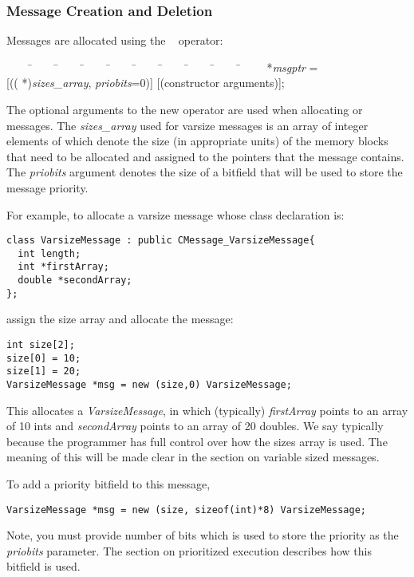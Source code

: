\subsubsection{Message Creation and Deletion}
\label{memory allocation}

Messages are allocated using the \CC\  operator:

\begin{tabbing}
~~~~ \=~~~~ \=~~~~ \=~~~~ \=~~~~ \=~~~~ \=~~~~ \=~~~~ \=~~~~ \=~~~~ \kill
\>  *{\it msgptr} = \\
\> \>  [(( *){\it sizes\_array},  {\it priobits}=0)] 
[(constructor arguments)]; \\
\end{tabbing}

The optional arguments to the new operator are used when allocating 
 or  messages. The {\it sizes\_array} 
used for varsize messages is an 
array of integer elements of which denote the size (in appropriate
units) of the memory blocks that need to be allocated and assigned to the
pointers that the message contains. The {\it priobits} argument 
denotes the size of a bitfield that will be used to store the message 
priority.   

For example, to allocate a varsize message whose 
class declaration is:

\begin{verbatim}
class VarsizeMessage : public CMessage_VarsizeMessage{
  int length;
  int *firstArray;
  double *secondArray;
};
\end{verbatim}

assign the size array and allocate the message:
\begin{verbatim}
int size[2];
size[0] = 10;
size[1] = 20;
VarsizeMessage *msg = new (size,0) VarsizeMessage;
\end{verbatim}

This allocates a {\it VarsizeMessage}, in which (typically) {\it firstArray}
points to an array of 10 ints and {\it secondArray} points to an array
of 20 doubles. We say typically because the programmer has full control over 
how the sizes array is used. The meaning of this will be made clear in the 
section on variable sized messages.


To add a priority bitfield to this message, 
\begin{verbatim}
VarsizeMessage *msg = new (size, sizeof(int)*8) VarsizeMessage;
\end{verbatim}
Note, you must provide number of bits which is used to store the priority as 
the {\it priobits} parameter. The section on prioritized execution describes
how this bitfield is used.

